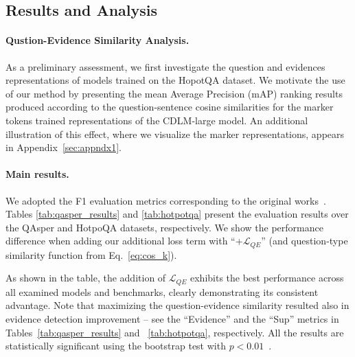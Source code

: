 \subsection{Results and Analysis}
\paragraph{Qustion-Evidence Similarity Analysis.} As a preliminary assessment, we first investigate the question and evidences representations of models trained on the HopotQA dataset. We motivate the use of our method by presenting the mean Average Precision (mAP) ranking results produced according to the question-sentence cosine similarities for the marker tokens trained representations of the CDLM-large model.  An additional illustration of this effect, where we visualize the marker representations, appears in Appendix~\ref{sec:appndx1}.

\paragraph{Main results.} We adopted the F1 evaluation metrics corresponding to the original works~\cite{dasigi-etal-2021-dataset,longformer}. Tables \ref{tab:qasper_results} and \ref{tab:hotpotqa} present the evaluation results over the QAsper and HotpoQA datasets, respectively. We show the performance difference when adding our additional loss term with ``+$\mathcal{L}_{QE}$'' (and question-type similarity function from Eq.~\ref{eq:cos_k}). 

As shown in the table, the addition of $\mathcal{L}_{QE}$ exhibits the best performance across all examined models and benchmarks, clearly demonstrating its consistent advantage. Note that maximizing the question-evidence similarity resulted also in evidence detection improvement -- see the ``Evidence'' and the ``Sup'' metrics in Tables~\ref{tab:qasper_results} and ~\ref{tab:hotpotqa}, respectively. All the results are statistically significant using the bootstrap test with ${p<0.01}$~\cite{dror-etal-2018-hitchhikers}.

